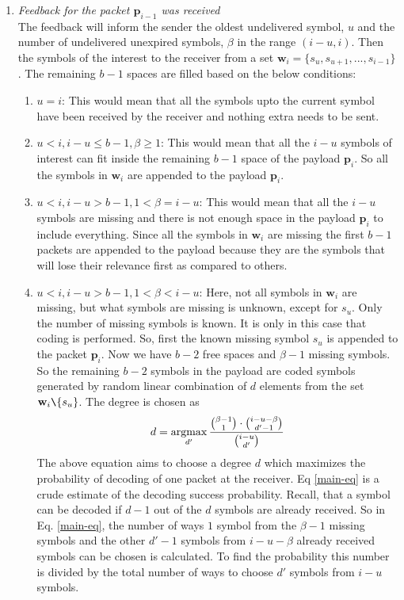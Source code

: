 \begin{enumerate}
	\item \textit{Feedback for the packet $\mathbf{p}_{i-1}$ was  received}\\
		The feedback will inform the sender the oldest undelivered symbol, $u$ and the number of undelivered unexpired symbols, $\beta$ in the range $(i-u, i)$. Then the symbols of the interest to the receiver from a set $\mathbf{w}_i = \{s_u, s_{u+1},..., s_{i-1}\}$. The remaining $b - 1$ spaces are filled based on the below conditions:
		\begin{enumerate}
			\item $u = i$: This would mean that all the symbols upto the current symbol have been received by the receiver and nothing extra needs to be sent.
			\item $u < i, i-u \leq b-1, \beta \geq 1$: This would mean that all the $i-u$ symbols of interest can fit inside the remaining $b-1$ space of the payload $\mathbf{p}_i$. So all the symbols in $\mathbf{w}_i$ are appended to the payload $\mathbf{p}_i$.
			\item $u < i, i-u > b-1, 1<\beta = i-u$: This would mean that all the $i-u$ symbols are missing and there is not enough space in the payload $\mathbf{p}_i$ to include everything. Since all the symbols in $\mathbf{w}_i$ are missing the first $b-1$ packets are appended to the payload because they are the symbols that will lose their relevance first as compared to others.
			\item $u < i, i-u > b-1, 1<\beta < i-u$: Here, not all symbols in $\mathbf{w}_i$ are missing, but what symbols are missing is unknown, except for $s_u$. Only the number of missing symbols is known. It is only in this case that coding is performed. So, first the known missing symbol $s_u$ is appended to the packet $\mathbf{p}_i$. Now we have $b-2$ free spaces and $\beta-1$ missing symbols. So the remaining $b-2$ symbols in the payload are coded symbols generated by random linear combination of $d$ elements from the set $\mathbf{w}_i \texttt{\char`\\} \{s_u\}$. The degree is chosen as
			\begin{equation}
				d = \operatorname*{argmax}_{d'} \frac{\binom{\beta - 1}{1}\cdot \binom{i-u-\beta}{d'-1}}{\binom{i-u}{d'}}
				\label{main-eq}
			\end{equation}
			The above equation aims to choose a degree $d$ which maximizes the probability of decoding of one packet at the receiver. Eq \ref{main-eq} is a crude estimate of the decoding success probability. Recall, that a symbol can be decoded if $d-1$ out of the $d$ symbols are already received. So in Eq. \ref{main-eq}, the number of ways $1$ symbol from the $\beta-1$ missing symbols and the other $d'-1$ symbols from $i-u-\beta$ already received symbols can be chosen is calculated. To find the probability this number is divided by the total number of ways to choose $d'$ symbols from $i-u$ symbols.

\end{enumerate}
\end{enumerate}
